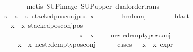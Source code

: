 \begin{isabellebody}
\ \ \ \ \ \ \isamarkupfalse%
\ {\isacharparenleft}{\kern0pt}metis\ SUP{\isacharunderscore}{\kern0pt}image\ SUP{\isacharunderscore}{\kern0pt}upper\ dual{\isacharunderscore}{\kern0pt}order{\isachardot}{\kern0pt}trans{\isacharparenright}{\kern0pt}\isanewline
\ \ \ \ \isamarkupfalse%
\ {\isachardoublequoteopen}{\isasymforall}x\ {\isasymin}\ {\isacharparenleft}{\kern0pt}x{}{}\ {\isacharbackquote}{\kern0pt}\ x{}{}{\isacharparenright}{\kern0pt}{\isachardot}{\kern0pt}\ stacked{\isacharunderscore}{\kern0pt}pos{\isacharunderscore}{\kern0pt}conj{\isacharunderscore}{\kern0pt}pos\ x{\isachardoublequoteclose}\isanewline
\ \ \ \ \ \ \isamarkupfalse%
\ hml{\isacharunderscore}{\kern0pt}conj\isanewline
\ \ \ \ \ \ \isamarkupfalse%
\ blast\isanewline
\ \ \ \ \isamarkupfalse%
\ {\isachardoublequoteopen}{\isacharparenleft}{\kern0pt}{\isacharparenleft}{\kern0pt}{\isasymexists}{\isasymphi}\ {\isasymin}\ {\isacharparenleft}{\kern0pt}x{}{}\ {\isacharbackquote}{\kern0pt}\ x{}{}{\isacharparenright}{\kern0pt}{\isachardot}{\kern0pt}\ {\isacharparenleft}{\kern0pt}{\isacharparenleft}{\kern0pt}stacked{\isacharunderscore}{\kern0pt}pos{\isacharunderscore}{\kern0pt}conj{\isacharunderscore}{\kern0pt}pos\ {\isasymphi}{\isacharparenright}{\kern0pt}\ {\isasymand}\ \isanewline
\ \ \ \ \ \ \ \ \ \ \ \ \ \ \ \ \ \ \ \ \ {\isacharparenleft}{\kern0pt}{\isasymforall}{\isasympsi}\ {\isasymin}\ {\isacharparenleft}{\kern0pt}x{}{}\ {\isacharbackquote}{\kern0pt}\ x{}{}{\isacharparenright}{\kern0pt}{\isachardot}{\kern0pt}\ {\isasympsi}\ {\isasymnoteq}\ {\isasymphi}\ {\isasymlongrightarrow}\ nested{\isacharunderscore}{\kern0pt}empty{\isacharunderscore}{\kern0pt}pos{\isacharunderscore}{\kern0pt}conj\ {\isasympsi}{\isacharparenright}{\kern0pt}{\isacharparenright}{\kern0pt}{\isacharparenright}{\kern0pt}\ {\isasymor}\isanewline
\ \ \ {\isacharparenleft}{\kern0pt}{\isasymforall}{\isasympsi}\ {\isasymin}\ {\isacharparenleft}{\kern0pt}x{}{}\ {\isacharbackquote}{\kern0pt}\ x{}{}{\isacharparenright}{\kern0pt}{\isachardot}{\kern0pt}\ nested{\isacharunderscore}{\kern0pt}empty{\isacharunderscore}{\kern0pt}pos{\isacharunderscore}{\kern0pt}conj\ {\isasympsi}{\isacharparenright}{\kern0pt}{\isacharparenright}{\kern0pt}{\isachardoublequoteclose}\isanewline
\ \ \ \ \isamarkupfalse%
{\isacharparenleft}{\kern0pt}cases\ {\isachardoublequoteopen}{\isasymexists}{\isasymphi}\ {\isasymin}\ {\isacharparenleft}{\kern0pt}x{}{}\ {\isacharbackquote}{\kern0pt}\ x{}{}{\isacharparenright}{\kern0pt}{\isachardot}{\kern0pt}\ expr{\isacharunderscore}{\kern0pt}{}\ {\isasymphi}\ {\isasymge}\ {}{\isachardoublequoteclose}{\isacharparenright}{\kern0pt}\isanewline

\end{isabellebody}

